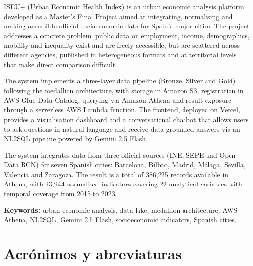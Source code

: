 ISEU+ (Urban Economic Health Index) is an urban economic analysis platform developed as a Master's Final Project aimed at integrating, normalising and making accessible official socioeconomic data for Spain's major cities. The project addresses a concrete problem: public data on employment, income, demographics, mobility and inequality exist and are freely accessible, but are scattered across different agencies, published in heterogeneous formats and at territorial levels that make direct comparison difficult.

The system implements a three-layer data pipeline (Bronze, Silver and Gold) following the medallion architecture, with storage in Amazon S3, registration in AWS Glue Data Catalog, querying via Amazon Athena and result exposure through a serverless AWS Lambda function. The frontend, deployed on Vercel, provides a visualisation dashboard and a conversational chatbot that allows users to ask questions in natural language and receive data-grounded answers via an NL2SQL pipeline powered by Gemini 2.5 Flash.

The system integrates data from three official sources (INE, SEPE and Open Data BCN) for seven Spanish cities: Barcelona, Bilbao, Madrid, Málaga, Sevilla, Valencia and Zaragoza. The result is a total of 386,225 records available in Athena, with 93,944 normalised indicators covering 22 analytical variables with temporal coverage from 2015 to 2023.

\textbf{Keywords:} urban economic analysis, data lake, medallion architecture, AWS Athena, NL2SQL, Gemini 2.5 Flash, socioeconomic indicators, Spanish cities.

\chapter*{Acrónimos y abreviaturas}

